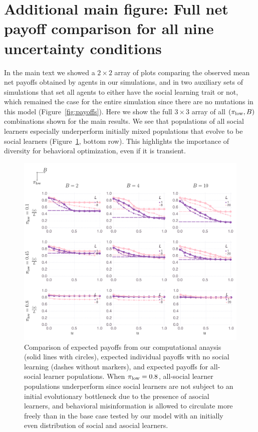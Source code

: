 \documentclass[letterpaper,11.5pt]{scrartcl}
\begin{document}

% 



\appendix


\section{Additional main figure: Full net payoff comparison for all nine uncertainty conditions} 

In the main text we showed a $2\times2$ array of plots comparing the observed
mean net payoffs obtained by agents in our simulations, and in two auxiliary
sets of simulations that set all agents to either have the social learning
trait or not, which remained the case for the entire simulation since there
are no mutations in this model (Figure~\ref{fig:payoffs}). Here we show the full $3\times3$ array of
all $(\pi_{\mathrm{low}}, B)$ combinations shown for the main results. We see that
populations of all social learners especially underperform initially mixed
populations that evolve to be social learners 
(Figure~\ref{fig:fullMeanPrevNetPayoffs}, bottom row). This highlights the
importance of diversity for behavioral optimization, even if it is transient.

\begin{figure}
  \caption{Comparison of expected payoffs from our computational anaysis (solid
    lines with circles), expected individual payoffs with no social learning
    (dashes without markers), and expected payoffs for all-social learner 
    populations. When $\pi_{\mathrm{low}} = 0.8$, all-social learner populations underperform
    since social learners are not subject to an initial evolutionary bottleneck
    due to the presence of asocial learners, and behavioral misinformation
    is allowed to circulate more freely than in the base case tested by 
    our model with an initially even distribution of social and asocial learners.
}
  \label{fig:fullMeanPrevNetPayoffs}
  \centering
    \includegraphics[width=\textwidth]{Figures/supplement/fullMeanPrevNetPayoffs.pdf}
\end{figure}
\end{document}
